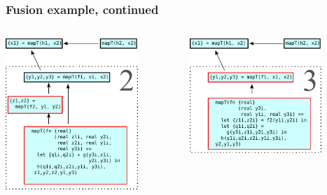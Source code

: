 \documentclass[rgb,dvipsnames]{beamer}
\begin{document}
\begin{frame}[t]
  \frametitle{Fusion example, continued}

  \centering
  \begin{columns}
    \begin{column}[T]{0.48\textwidth}
      \includegraphics[width=5cm]{img/fusion-2.pdf}
    \end{column}\hfill
    \begin{column}[T]{0.48\textwidth}
      \includegraphics[width=5cm]{img/fusion-3.pdf}
    \end{column}
  \end{columns}

\end{frame}
\end{document}
